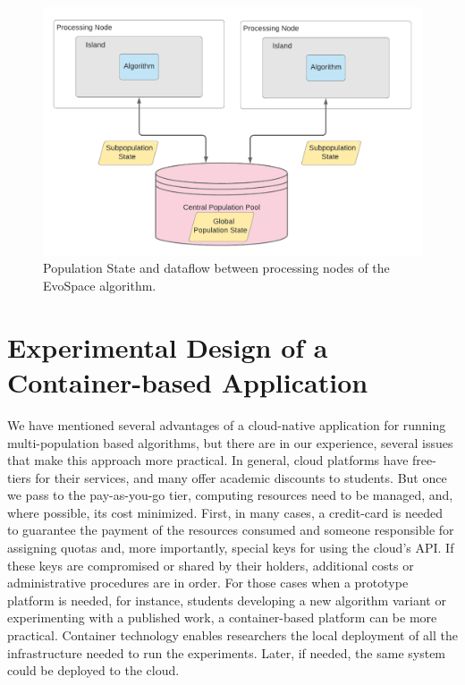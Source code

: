 \documentclass[review]{elsarticle}
\begin{document}
\begin{figure}[ht]
    \centering
    \includegraphics[width=\textwidth]{population_pool}
    \caption{Population State and dataflow between processing nodes of the EvoSpace algorithm.}
    \label{fig:population_pool}
\end{figure}


\section{Experimental Design of a Container-based Application} 
\label{docker}

We have mentioned several advantages of a cloud-native application for running
multi-population based algorithms, but there are in our experience, several
issues that make this approach more practical. %
In general, cloud platforms have free-tiers    
for their services, and many offer academic discounts to students. But once we
pass to the pay-as-you-go tier, computing resources need to be
managed, and, where possible, its cost minimized.  First,
in many cases,  a credit-card is needed to guarantee the payment of the
resources consumed and someone responsible for assigning quotas and, more
importantly, special keys for using the cloud's API.  If these keys are
compromised or shared by their holders,  additional costs or administrative
procedures are in order. For those cases when a prototype platform is needed,
for instance, students developing a new algorithm variant or experimenting with
a published work, a container-based platform can be more practical. Container
technology enables researchers the local deployment of all the infrastructure
needed to run the experiments. Later, if needed, the same system could be
deployed to the cloud.
\end{document}
